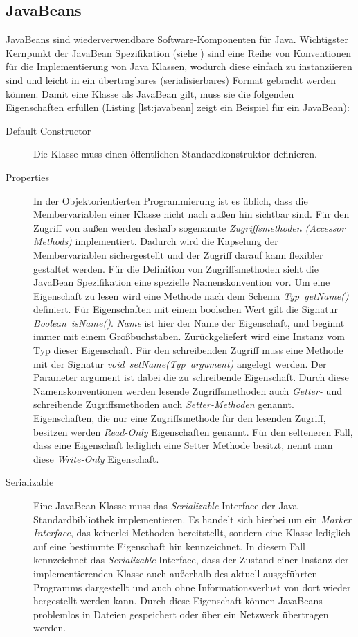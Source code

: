 \pagebreak
\lstset{language=java}


\subsection{JavaBeans}\label{subsec:javabeans}
JavaBeans sind wiederverwendbare Software-Komponenten für Java. Wichtigster
Kernpunkt der JavaBean Spezifikation (siehe \cite{hamilton:1997}) sind eine Reihe
von Konventionen für die Implementierung von Java Klassen, wodurch diese einfach
zu instanziieren sind und leicht in ein übertragbares (serialisierbares) Format
gebracht werden können. Damit eine Klasse als JavaBean gilt, muss sie die
folgenden Eigenschaften erfüllen (Listing \ref{lst:javabean} zeigt
ein Beispiel für ein JavaBean):

\begin{description}
\item[Default Constructor] Die Klasse muss einen öffentlichen Standardkonstruktor
definieren. 
\item[Properties] In der Objektorientierten Programmierung ist es üblich, dass
die Membervariablen einer Klasse nicht nach außen hin sichtbar sind. Für den
Zugriff von außen werden deshalb sogenannte \emph{Zugriffsmethoden (Accessor
Methods)} implementiert. Dadurch wird die Kapselung der Membervariablen
sichergestellt und der Zugriff darauf kann flexibler gestaltet werden. Für die
Definition von Zugriffsmethoden sieht die JavaBean Spezifikation eine spezielle
Namenskonvention vor. Um eine Eigenschaft zu lesen wird eine Methode nach dem
Schema \emph{Typ~getName()} definiert. Für Eigenschaften mit einem boolschen Wert
gilt die Signatur \emph{Boolean~isName()}. \emph{Name} ist hier der Name der
Eigenschaft, und beginnt immer mit einem Großbuchstaben. Zurückgeliefert wird
eine Instanz vom Typ dieser Eigenschaft. Für den schreibenden Zugriff muss eine
Methode mit der Signatur \emph{void~setName(Typ~argument)} angelegt werden. Der
Parameter argument ist dabei die zu schreibende Eigenschaft. Durch
diese Namenskonventionen werden lesende Zugriffsmethoden auch \emph{Getter-} und
schreibende Zugriffsmethoden auch \emph{Setter-Methoden} genannt. Eigenschaften,
die nur eine Zugriffsmethode für den lesenden Zugriff, besitzen werden
\emph{Read-Only} Eigenschaften genannt. Für den selteneren Fall, dass eine
Eigenschaft lediglich eine Setter Methode besitzt, nennt man diese
\emph{Write-Only} Eigenschaft.
\item[Serializable] Eine JavaBean Klasse muss das \emph{Serializable} Interface
der Java Standardbibliothek implementieren. Es handelt sich hierbei um ein
\emph{Marker Interface}, das keinerlei Methoden bereitstellt, sondern eine Klasse
lediglich auf eine bestimmte Eigenschaft hin kennzeichnet. In diesem Fall
kennzeichnet das \emph{Serializable} Interface, dass der Zustand einer Instanz
der implementierenden Klasse auch außerhalb des aktuell ausgeführten Programms
dargestellt und auch ohne Informationsverlust von dort wieder hergestellt werden
kann. Durch diese Eigenschaft können JavaBeans problemlos in Dateien gespeichert
oder über ein Netzwerk übertragen werden.
\end{description}

